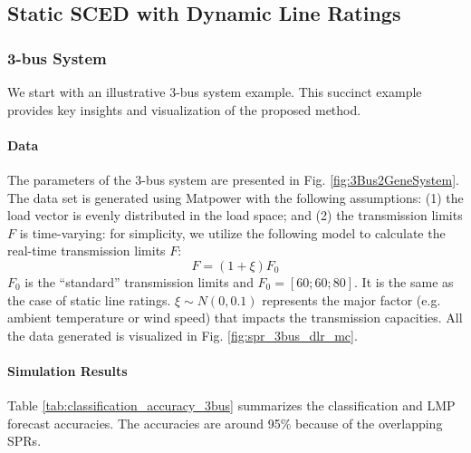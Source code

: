 \documentclass[letterpaper, 11pt]{article}
\theoremstyle{plain}
\theoremstyle{definition}
\begin{document}
\subsection{Static SCED with Dynamic Line Ratings} \label{sub:case_study_dlr}
\subsubsection{3-bus System} \label{ssub:3_bus_system_dlr}
We start with an illustrative 3-bus system example. This succinct example provides key insights and visualization of the proposed method.

\paragraph{Data} \label{par:3bus_data}
The parameters of the 3-bus system are presented in Fig. \ref{fig:3Bus2GeneSystem}.
The data set is generated using Matpower with the following assumptions: 
(1) the load vector is evenly distributed in the load space;
and (2) the transmission limits $F$ is time-varying: for simplicity, we utilize the following model to calculate the real-time transmission limits $F$:
\begin{equation}
\label{eqn:model_dlr}
F = (1+\xi) F_0
\end{equation}
$F_0$ is the ``standard'' transmission limits and $F_0 = [60;60;80]$. It is the same as the case of static line ratings.  
$\xi \sim N(0,0.1)$ represents the major factor (e.g. ambient temperature or wind speed) that impacts the transmission capacities. All the data generated is visualized in Fig. \ref{fig:spr_3bus_dlr_mc}.








\paragraph{Simulation Results} \label{par:classification}
Table \ref{tab:classification_accuracy_3bus} summarizes the classification and LMP forecast accuracies. The accuracies are around 95\% because of the overlapping SPRs.
\end{document}
